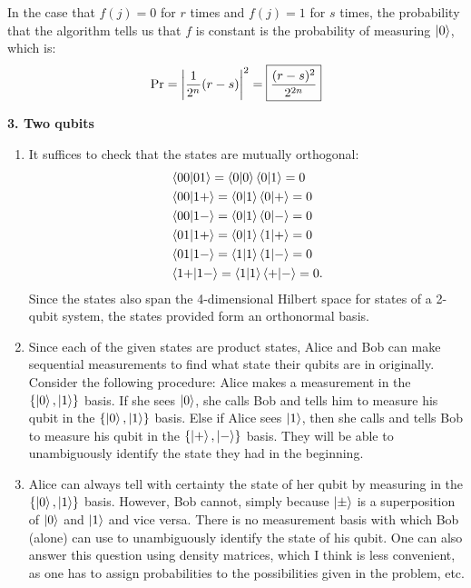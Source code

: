 \documentclass{article}
\theoremstyle{definition}
\newcommand{\f}[2]{\frac{#1}{#2}}
\begin{document}
In the case that $f(j) = 0$ for $r$ times and $f(j)=1$ for $s$ times, the probability that the algorithm tells us that $f$ is constant is the probability of measuring $\ket{0}$, which is:
\begin{align*}
	\Pr = \abs{\f{1}{2^n} (r-s)   }^2 = \boxed{\f{(r-s)^2}{2^{2n}}}
\end{align*}

\newpage

\noindent \textbf{3. Two qubits}

\begin{enumerate}[label=(\alph*)]
	\item It suffices to check that the states are mutually orthogonal:
	\begin{align*}
		&\bra{00}\ket{01} = \braket{0}\bra{0}\ket{1} = 0\\
		&\bra{00}\ket{1+} = \bra{0}\ket{1}\bra{0}\ket{+} = 0 \\
		&\bra{00}\ket{1-} = \bra{0}\ket{1}\bra{0}\ket{-} = 0\\
		&\bra{01}\ket{1+} = \bra{0}\ket{1}\bra{1}\ket{+} = 0 \\
		&\bra{01}\ket{1-} = \bra{1}\ket{1}\bra{1}\ket{-} = 0\\
		&\bra{1+}\ket{1-} = \bra{1}\ket{1}\bra{+}\ket{-} =0. 
	\end{align*}
	Since the states also span the 4-dimensional Hilbert space for states of a 2-qubit system, the states provided form an orthonormal basis. 
	
	\item Since each of the given states are product states, Alice and Bob can make sequential measurements to find what state their qubits are in originally. Consider the following procedure: Alice makes a measurement in the $\{\ket{0},\ket{1}\}$ basis. If she sees $\ket{0}$, she calls Bob and tells him to measure his qubit in the $\{\ket{0}, \ket{1}\}$ basis. Else if Alice sees $\ket{1}$, then she calls and tells Bob to measure his qubit in the $\{ \ket{+}, \ket{-}  \}$ basis. They will be able to unambiguously identify the state they had in the beginning.
	
	\item Alice can always tell with certainty the state of her qubit by measuring in the $\{  \ket{0},\ket{1} \}$ basis. However, Bob cannot, simply because $\ket{\pm}$ is a superposition of $\ket{0}$ and $\ket{1}$ and vice versa. There is no measurement basis with which Bob (alone) can use to unambiguously identify the state of his qubit.  One can also answer this question using density matrices, which I think is less convenient, as one has to assign probabilities to the possibilities given in the problem, etc.
	

\end{enumerate}
\end{document}
